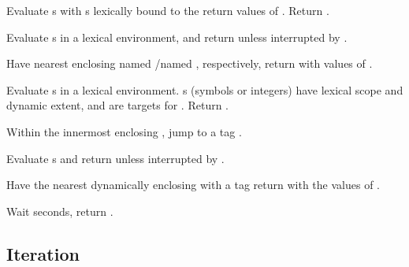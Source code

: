 \begin{LIST}{1cm}
  {
  Evaluate
  s with s lexically bound to the return values of
  . Return .
  }

  { 
    Evaluate s in a lexical environment, and
    return  unless interrupted by
    . 
  }

  {
  Have nearest enclosing  named /named \NIL,
  respectively, return with values of .  
  }

  {
  Evaluate s in a lexical environment. s (symbols or integers) have lexical
  scope and dynamic extent, and are targets for . Return
  \retval{\NIL}. 
  }

  {
    Within the innermost enclosing , jump to a tag  .
  }

  {
    Evaluate s and return  unless
    interrupted by . 
  }

  {Have the nearest dynamically
  enclosing  with a tag   return with the
  values of .
  }

  {Wait  seconds, return \retval{\NIL}.
    }

\end{LIST}


\subsection{Iteration}

